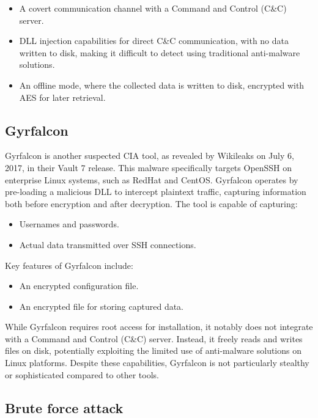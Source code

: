 \begin{itemize}
    \item A covert communication channel with a Command and Control
      (C\&C) server.
    \item DLL injection capabilities for direct C\&C communication,
      with no data written to disk, making it difficult to detect
      using traditional anti-malware solutions.
    \item An offline mode, where the collected data is written to
      disk, encrypted with AES for later retrieval.
\end{itemize}


\subsection{Gyrfalcon}

Gyrfalcon is another suspected CIA tool, as revealed by Wikileaks on
July 6, 2017, in their Vault 7 release. This malware specifically
targets OpenSSH on enterprise Linux systems, such as RedHat and
CentOS. Gyrfalcon operates by pre-loading a malicious DLL to intercept
plaintext traffic, capturing information both before encryption and
after decryption. The tool is capable of capturing:

\begin{itemize}
    \item Usernames and passwords.
    \item Actual data transmitted over SSH connections.
\end{itemize}

Key features of Gyrfalcon include:

\begin{itemize}
    \item An encrypted configuration file.
    \item An encrypted file for storing captured data.
\end{itemize}

While Gyrfalcon requires root access for installation, it notably does
not integrate with a Command and Control (C\&C) server. Instead, it
freely reads and writes files on disk, potentially exploiting the
limited use of anti-malware solutions on Linux platforms. Despite
these capabilities, Gyrfalcon is not particularly stealthy or
sophisticated compared to other tools.


\subsection{Brute force attack}

